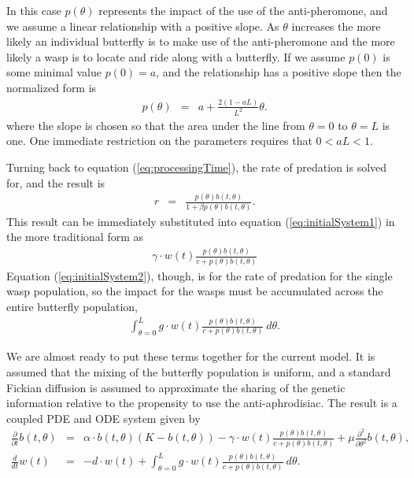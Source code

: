 \documentclass[12pt]{article}
\begin{document}
In this case $p(\theta)$ represents the impact of the use of the
anti-pheromone, and we assume a linear relationship with a positive
slope. As $\theta$ increases the more likely an individual butterfly
is to make use of the anti-pheromone and the more likely a wasp is to
locate and ride along with a butterfly. If we assume $p(0)$ is some
minimal value $p(0)=a$, and the relationship has a positive slope then
the normalized form is
\begin{eqnarray}
  \label{eq:linearFormP}
  p(\theta) & = & a + \frac{2(1-aL)}{L^2} \theta.
\end{eqnarray}
where the slope is chosen so that the area under the line from
$\theta=0$ to $\theta=L$ is one. One immediate restriction on the
parameters requires that $0<aL<1$.

Turning back to equation (\ref{eq:processingTime}), the rate of
predation is solved for, and the result is
\begin{eqnarray}
  \label{eq:rateOfPredation}
  r & = &  \frac{p(\theta) b(t,\theta) }{1 + \beta p(\theta) b(t,\theta)}.
\end{eqnarray}
This result can be immediately substituted into equation
(\ref{eq:initialSystem1}) in the more traditional form as
\begin{eqnarray}
  \label{eq:butterflyPredationRate}
  \gamma \cdot w(t) \frac{p(\theta) b(t,\theta) }{c +  p(\theta) b(t,\theta)}
\end{eqnarray}
Equation (\ref{eq:initialSystem2}), though, is for the rate of predation
for the single wasp population, so the impact for the wasps must be
accumulated across the entire butterfly population,
\begin{eqnarray}
  \label{eq:totalWaspPredationRate}
  \int^L_{\theta=0} g \cdot w(t) \frac{p(\theta) b(t,\theta) }{c + p(\theta) b(t,\theta)} ~ d\theta.
\end{eqnarray}

We are almost ready to put these terms together for the current
model. It is assumed that the mixing of the butterfly population is
uniform, and a standard Fickian diffusion is assumed to approximate
the sharing of the genetic information relative to the propensity to
use the anti-aphrodisiac. The result is a coupled PDE and ODE system
given by 
\begin{eqnarray}
  \label{eq:odePDE1}
  \frac{\partial}{\partial t} b(t,\theta) & = &
      \alpha \cdot b(t,\theta) (K - b(t,\theta))
      - \gamma \cdot w(t) \frac{p(\theta) b(t,\theta)}{c+p(\theta)b(t,\theta)}
      + \mu \frac{\partial^2}{\partial \theta^2} b(t,\theta) , \\
  \label{eq:odePDE2}
  \frac{d}{dt} w(t) & = & -d \cdot w(t) +
      \int^L_{\theta=0} g \cdot w(t) \frac{p(\theta) b(t,\theta) }{c + p(\theta) b(t,\theta)} ~ d\theta.
\end{eqnarray}
\end{document}

